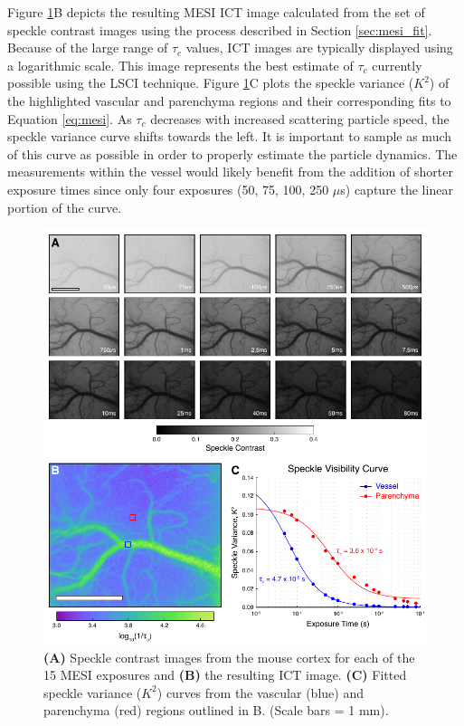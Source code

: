 Figure \ref{fig:mesidemo}B depicts the resulting MESI ICT image calculated from the set of speckle contrast images using the process described in Section \ref{sec:mesi_fit}. Because of the large range of $\tau_c$ values, ICT images are typically displayed using a logarithmic scale. This image represents the best estimate of $\tau_c$ currently possible using the LSCI technique. Figure \ref{fig:mesidemo}C plots the speckle variance ($K^2$) of the highlighted vascular and parenchyma regions and their corresponding fits to Equation \ref{eq:mesi}. As $\tau_c$ decreases with increased scattering particle speed, the speckle variance curve shifts towards the left. It is important to sample as much of this curve as possible in order to properly estimate the particle dynamics. The measurements within the vessel would likely benefit from the addition of shorter exposure times since only four exposures (50, 75, 100, 250 $\mu$s) capture the linear portion of the curve.

\begin{figure}
    \includegraphics{figures/chapter_4/mesidemo.pdf}
    \caption{
        \label{fig:mesidemo}
        \textbf{(A)} Speckle contrast images from the mouse cortex for each of the 15 MESI exposures and \textbf{(B)} the resulting ICT image. \textbf{(C)} Fitted speckle variance ($K^2$) curves from the vascular (blue) and parenchyma (red) regions outlined in B. (Scale bars = 1 mm).
    }
\end{figure}



